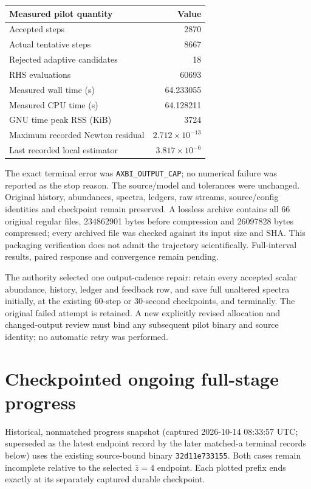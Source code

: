 \documentclass[11pt]{article}
\begin{document}
\begin{center}
\begin{tabular}{lr}\toprule
Measured pilot quantity & Value\\\midrule
Accepted steps & 2870\\
Actual tentative steps & 8667\\
Rejected adaptive candidates & 18\\
RHS evaluations & 60693\\
Measured wall time (s) & 64.233055\\
Measured CPU time (s) & 64.128211\\
GNU time peak RSS (KiB) & 3724\\
Maximum recorded Newton residual & $2.712\times10^{-13}$\\
Last recorded local estimator & $3.817\times10^{-6}$\\\bottomrule
\end{tabular}
\end{center}

The exact terminal error was \texttt{AXBI\_OUTPUT\_CAP}; no numerical failure was reported as the stop reason. The source/model and tolerances were unchanged. Original history, abundances, spectra, ledgers, raw streams, source/config identities and checkpoint remain preserved. A lossless archive contains all 66 original regular files, 234862901 bytes before compression and 26097828 bytes compressed; every archived file was checked against its input size and SHA. This packaging verification does not admit the trajectory scientifically. Full-interval results, paired response and convergence remain pending.

The authority selected one output-cadence repair: retain every accepted scalar abundance, history, ledger and feedback row, and save full unaltered spectra initially, at the existing 60-step or 30-second checkpoints, and terminally. The original failed attempt is retained. A new explicitly revised allocation and changed-output review must bind any subsequent pilot binary and source identity; no automatic retry was performed.

\section{Checkpointed ongoing full-stage progress}
Historical, nonmatched progress snapshot (captured 2026-10-14 08:33:57 UTC; superseded as the latest endpoint record by the later matched-a terminal records below) uses the existing source-bound binary \texttt{32d11e733155}. Both cases remain incomplete relative to the selected $\bar z=4$ endpoint. Each plotted prefix ends exactly at its separately captured durable checkpoint.
\end{document}
